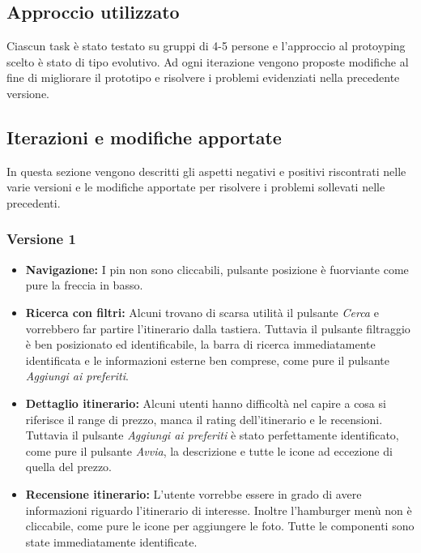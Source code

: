 \subsection{Approccio utilizzato}

Ciascun task è stato testato su gruppi di 4-5 persone e l'approccio al protoyping scelto è stato di tipo evolutivo. Ad ogni iterazione vengono proposte modifiche al fine di migliorare il prototipo e risolvere i problemi evidenziati nella precedente versione.

\clearpage


\subsection{Iterazioni e modifiche apportate}

In questa sezione vengono descritti gli aspetti negativi e positivi riscontrati nelle varie versioni e le modifiche apportate per risolvere i problemi sollevati nelle precedenti.
\subsubsection{Versione 1}

\begin{itemize}

\item \textbf{Navigazione:} I pin non sono cliccabili, pulsante posizione è fuorviante come pure la freccia in basso.

\item \textbf{Ricerca con filtri:} Alcuni trovano di scarsa utilità il pulsante \emph{Cerca} e vorrebbero far partire l'itinerario dalla tastiera. Tuttavia il pulsante filtraggio è ben posizionato ed identificabile, la barra di ricerca immediatamente identificata e le informazioni esterne ben comprese, come pure il pulsante \emph{Aggiungi ai preferiti}.

\item \textbf{Dettaglio itinerario:} Alcuni utenti hanno difficoltà nel capire a cosa si riferisce il range di prezzo, manca il rating dell’itinerario e
le recensioni. Tuttavia il pulsante \emph{Aggiungi ai preferiti} è stato perfettamente identificato, come pure il pulsante \emph{Avvia}, la descrizione e tutte le icone ad eccezione di quella del prezzo.

\item \textbf{Recensione itinerario:} L'utente vorrebbe essere in grado di avere informazioni riguardo l'itinerario di interesse. Inoltre l'hamburger menù non è cliccabile, come pure le icone per aggiungere le foto. Tutte le componenti sono state immediatamente identificate.

\end{itemize}

